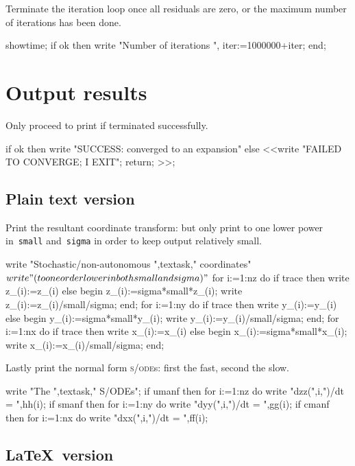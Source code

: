 \documentclass[11pt,a5paper]{article}
\def\sde{\textsc{s/ode}}
\begin{document}
Terminate the iteration loop once all residuals are zero,
or the maximum number of iterations has been done.
\begin{reduce}
  showtime;
  if ok then write "Number of iterations ",
    iter:=1000000+iter;
end;
\end{reduce}





\section{Output results}

Only proceed to print if terminated successfully.
\begin{reduce}
if ok 
  then write "SUCCESS: converged to an expansion"
  else <<write "FAILED TO CONVERGE; I EXIT";
    return; >>;
\end{reduce}


\subsection{Plain text version}

Print the resultant coordinate transform: but only print to
one lower power in~\verb|small| and~\verb|sigma| in order to
keep output relatively small.
\begin{reduce}
write "Stochastic/non-autonomous ",textask," coordinates"$
write "(to one order lower in both small and sigma)"$
for i:=1:nz do if trace then write z_(i):=z_(i)
    else begin z_(i):=sigma*small*z_(i); 
         write z_(i):=z_(i)/small/sigma; end;
for i:=1:ny do if trace then write y_(i):=y_(i) 
    else begin y_(i):=sigma*small*y_(i); 
         write y_(i):=y_(i)/small/sigma; end;
for i:=1:nx do if trace then write x_(i):=x_(i) 
    else begin x_(i):=sigma*small*x_(i); 
         write x_(i):=x_(i)/small/sigma; end;
\end{reduce}

Lastly print the normal form \sde{}s: first the fast, second
the slow.
\begin{reduce}
write "The ",textask," S/ODEs";
if umanf then for i:=1:nz do write "dzz(",i,")/dt = ",hh(i);
if smanf then for i:=1:ny do write "dyy(",i,")/dt = ",gg(i);
if cmanf then for i:=1:nx do write "dxx(",i,")/dt = ",ff(i);
\end{reduce}



\subsection{\LaTeX\ version}
\end{document}
